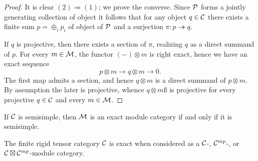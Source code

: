 \documentclass{amsart}
\begin{document}
\begin{proof}
	It is clear $(2) \Rightarrow (1)$; we prove the converse. Since $\mathcal P$ forms a jointly generating collection of object it follows that for any object $q \in \mathcal C$ there exists a finite sum $p = \oplus_i p_i$ of object of $\mathcal P$ and a surjection $\pi:p \twoheadrightarrow q$. 
	
		 If $q$ is projective, then there exists a section of $\pi$, realizing $q$ as a direct summand of $p$. For every $m \in \mathcal M$, the functor $(-)\otimes m$ is right exact, hence we have an exact sequence
		\begin{equation*}
			p \otimes m \to q \otimes m \to 0.
		\end{equation*}
		 The first map admits a section, and hence $q \otimes m$ is a direct summand of $p \otimes m$. By assumption the later is projective, whence $q \otimes mß$ is projective for every projective $q \in \mathcal C$ and every $m \in \mathcal M$. 
\end{proof}

\begin{example}
	If $\mathcal C$ is semisimple, then $\mathcal M$ is an exact module category if and only if it is semisimple.
\end{example}

\begin{example} \label{ex:exactness}
	The finite rigid tensor category $\mathcal C$ is exact when considered as a $\mathcal C$-, $\mathcal C^{mp}$-, or $\mathcal C \boxtimes \mathcal C^{mp}$-module category. 
\end{example}
\end{document}
